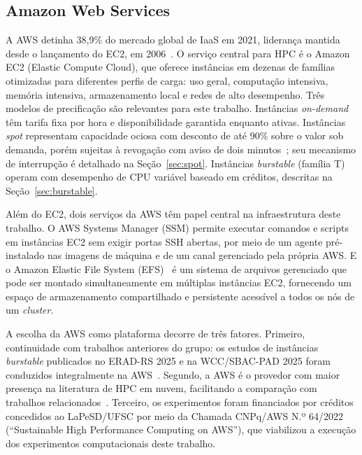 \subsection{Amazon Web Services}
\label{sec:aws}

A AWS detinha 38,9\% do mercado global de IaaS em 2021, liderança mantida desde o
lançamento do EC2, em 2006~\cite{gartner2022iaas}. O serviço central para HPC é o
Amazon EC2 (Elastic Compute Cloud), que oferece instâncias em dezenas de famílias
otimizadas para diferentes perfis de carga: uso geral, computação intensiva, memória
intensiva, armazenamento local e redes de alto desempenho. Três modelos de
precificação são relevantes para este trabalho. Instâncias \textit{on-demand} têm
tarifa fixa por hora e disponibilidade garantida enquanto ativas. Instâncias
\textit{spot} representam capacidade ociosa com desconto de até 90\% sobre o valor
sob demanda, porém sujeitas à revogação com aviso de dois minutos~\cite{aws2018spot};
seu mecanismo de interrupção é detalhado na Seção~\ref{sec:spot}. Instâncias
\textit{burstable} (família T) operam com desempenho de CPU variável baseado em
créditos, descritas na Seção~\ref{sec:burstable}.

Além do EC2, dois serviços da AWS têm papel central na infraestrutura deste trabalho. O
AWS Systems Manager (SSM) permite executar comandos e scripts em instâncias EC2 sem exigir
portas SSH abertas, por meio de um agente pré-instalado nas imagens de máquina e de um canal
gerenciado pela própria AWS. E o Amazon Elastic File System (EFS)~\cite{aws2026efs} é um sistema
de arquivos gerenciado que pode ser montado simultaneamente em múltiplas instâncias EC2,
fornecendo um espaço de armazenamento compartilhado e persistente acessível a todos os nós
de um \textit{cluster}.

A escolha da AWS como plataforma decorre de três fatores. Primeiro, continuidade com
trabalhos anteriores do grupo: os estudos de instâncias \textit{burstable} publicados
no ERAD-RS 2025 e na WCC/SBAC-PAD 2025 foram conduzidos integralmente na
AWS~\cite{soda2025erad,soda2025wcc}. Segundo, a AWS é o provedor com maior presença
na literatura de HPC em nuvem, facilitando a comparação com trabalhos
relacionados~\cite{dancheva2023efa,gong2015cost,zhou2022farspot}. Terceiro, os
experimentos foram financiados por créditos concedidos ao LaPeSD/UFSC por meio da
Chamada CNPq/AWS N.º 64/2022 (``Sustainable High Performance Computing on AWS''),
que viabilizou a execução dos experimentos computacionais deste trabalho.

